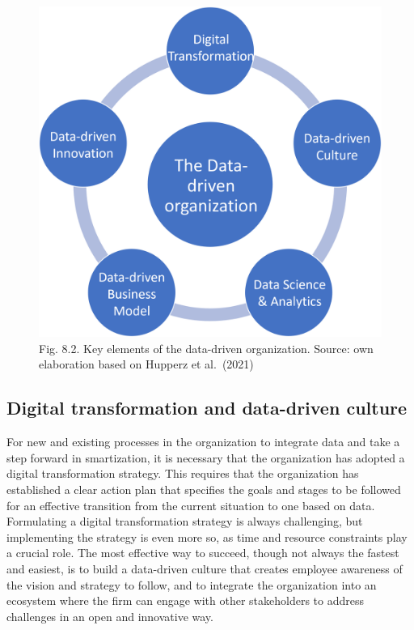\documentclass[
  letterpaper,
  DIV=11,
  numbers=noendperiod]{scrreprt}
\begin{document}
\begin{figure}

{\centering \includegraphics[width=5.20833in,height=\textheight]{img/fig8.png}

}

\caption{Fig. 8.2. Key elements of the data-driven organization. Source:
own elaboration based on Hupperz et al.~(2021)}

\end{figure}

\hypertarget{digital-transformation-and-data-driven-culture}{%
\subsection{Digital transformation and data-driven
culture}\label{digital-transformation-and-data-driven-culture}}

For new and existing processes in the organization to integrate data and
take a step forward in smartization, it is necessary that the
organization has adopted a digital transformation strategy. This
requires that the organization has established a clear action plan that
specifies the goals and stages to be followed for an effective
transition from the current situation to one based on data. Formulating
a digital transformation strategy is always challenging, but
implementing the strategy is even more so, as time and resource
constraints play a crucial role. The most effective way to succeed,
though not always the fastest and easiest, is to build a data-driven
culture that creates employee awareness of the vision and strategy to
follow, and to integrate the organization into an ecosystem where the
firm can engage with other stakeholders to address challenges in an open
and innovative way.
\end{document}
